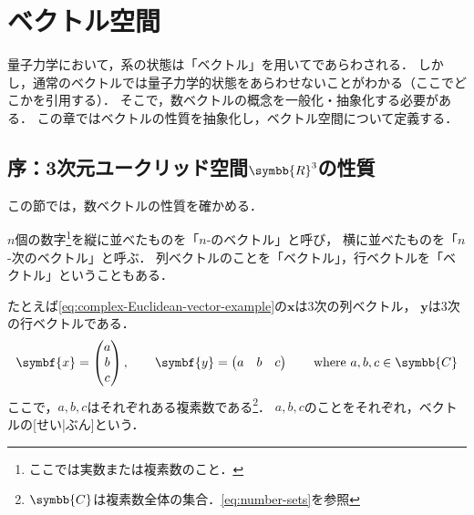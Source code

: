 \documentclass[../sotsu.tex]{subfiles}
\begin{document}
\section{ベクトル空間}

量子力学において，系の状態は「ベクトル」を用いてであらわされる．
しかし，通常のベクトルでは量子力学的状態をあらわせないことがわかる（ここでどこかを引用する）．
そこで，数ベクトルの概念を一般化・抽象化する必要がある．
この章ではベクトルの性質を抽象化し，ベクトル空間について定義する．

\subsection*{序：3次元ユークリッド空間$\symbb{R}^3$の性質}

この節では，数ベクトルの性質を確かめる．

$n$個の数字\footnote{ここでは実数または複素数のこと．}を縦に並べたものを「$n$-のベクトル」と呼び，
横に並べたものを「$n$-次のベクトル」と呼ぶ\cite{miyake-lin-2008}．
列ベクトルのことを「ベクトル」，行ベクトルを「ベクトル」ということもある．

たとえば\cref{eq:complex-Euclidean-vector-example}の$\symbf{x}$は3次の列ベクトル，
$\symbf{y}$は3次の行ベクトルである．
\begin{align}
    \label{eq:complex-Euclidean-vector-example}
    \symbf{x} = 
    \begin{pmatrix}
        a  \\  b  \\  c
    \end{pmatrix}
    , \qquad
    \symbf{y} = 
    \begin{pmatrix}
        a  &  b  &  c
    \end{pmatrix}
    \qquad 
    \text{where $a, b, c \in \symbb{C}$}
\end{align}
ここで，$a, b, c$はそれぞれある複素数である\footnote{$\symbb{C}$は複素数全体の集合．\cref{eq:number-sets}を参照}．
$a, b, c$のことをそれぞれ，ベクトルの[せい|ぶん]という．
\end{document}
